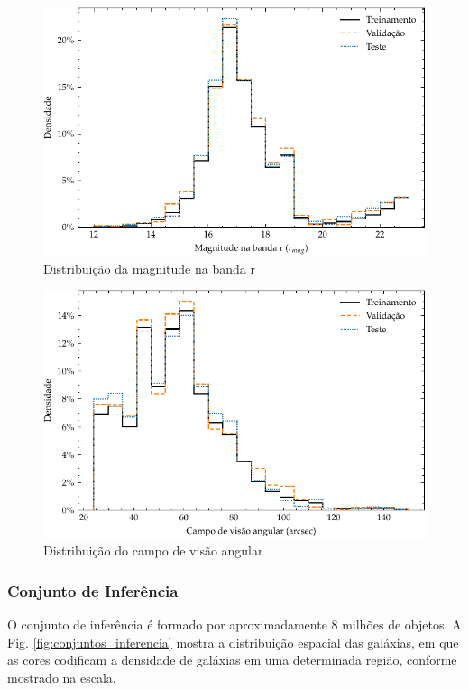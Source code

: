 \begin{figure}[!ht]
  \centering
  \includegraphics[width=\linewidth]{notebooks/plots/conjuntos_magr.pdf}
  \caption{Distribuição da magnitude na banda r}
  \label{fig:conjuntos_magr}
\end{figure}


\begin{figure}[!ht]
  \centering
  \includegraphics[width=\linewidth]{notebooks/plots/conjuntos_fov.pdf}
  \caption{Distribuição do campo de visão angular}
  \label{fig:conjuntos_fov}
\end{figure}


\subsubsection{Conjunto de Inferência}
\label{sec:aquisicao-inferencia}

O conjunto de inferência é formado por aproximadamente 8 milhões de objetos. A Fig. \ref{fig:conjuntos_inferencia} mostra a distribuição espacial das galáxias, em que as cores codificam a densidade de galáxias em uma determinada região, conforme mostrado na escala.

